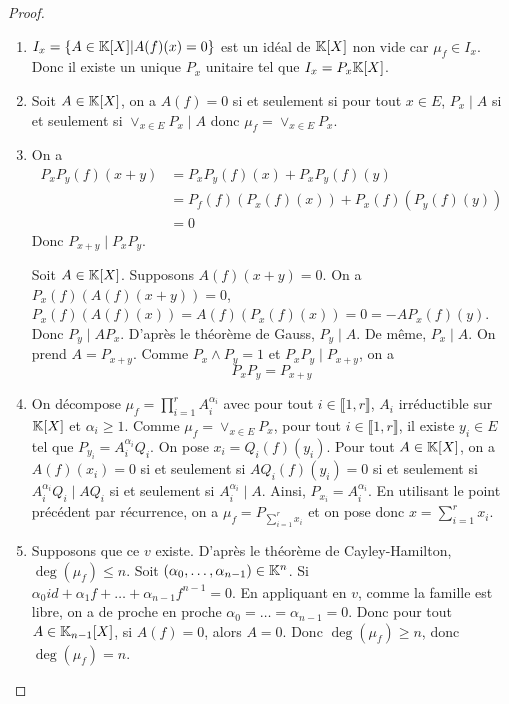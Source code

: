 \documentclass[12pt]{article}
\begin{document}
\begin{proof}
	\phantom{}
	\begin{enumerate}
		\item $I_{x}=\left\lbrace A\in\mathbb{K}[X]\middle| A(f)(x)=0\right\rbrace$ est un idéal de $\mathbb{K}[X]$ non vide car $\mu_{f}\in I_{x}$. Donc il existe un unique $P_{x}$ unitaire tel que $I_{x}=P_{x}\mathbb{K}[X]$.
		\item Soit $A\in\mathbb{K}[X]$, on a $A(f)=0$ si et seulement si pour tout $x\in E$, $P_{x}\mid A$ si et seulement si $\vee_{x\in E}P_{x}\mid A$ donc $\mu_{f}=\vee_{x\in E}P_{x}$.
		\item On a 
		\begin{align}
			P_{x}P_{y}(f)(x+y)
			&=P_{x}P_{y}(f)(x)+P_{x}P_{y}(f)(y)\\
			&=P_{f}(f)\left(P_{x}(f)(x)\right)+P_{x}(f)\left(P_{y}(f)(y)\right)\\
			&=0
		\end{align}
		Donc $P_{x+y}\mid P_{x}P_{y}$.

		Soit $A\in\mathbb{K}[X]$. Supposons $A(f)(x+y)=0$. On a $P_{x}(f)\left(A(f)(x+y)\right)=0$, $P_{x}(f)\left(A(f)(x)\right)=A(f)\left(P_{x}(f)(x)\right)=0=-AP_{x}(f)(y)$. Donc $P_{y}\mid AP_{x}$. D'après le théorème de Gauss, $P_{y}\mid A$. De même, $P_{x}\mid A$. On prend $A=P_{x+y}$. Comme $P_{x}\wedge P_{y}=1$ et $P_{x}P_{y}\mid P_{x+y}$, on a 
		\begin{equation}
			\boxed{P_{x}P_{y}=P_{x+y}}
		\end{equation}

		\item On décompose $\mu_{f}=\prod_{i=1}^{r}A_{i}^{\alpha_{i}}$ avec pour tout $i\in\llbracket1,r\rrbracket$, $A_{i}$ irréductible sur $\mathbb{K}[X]$ et $\alpha_{i}\geqslant1$.
		Comme $\mu_{f}=\vee_{x\in E}P_{x}$, pour tout $i\in\llbracket1,r\rrbracket$, il existe $y_{i}\in E$ tel que $P_{y_{i}}=A_{i}^{\alpha_{i}}Q_{i}$. On pose $x_{i}=Q_{i}(f)(y_{i})$. Pour tout $A\in\mathbb{K}[X]$, on a $A(f)(x_{i})=0$ si et seulement si $AQ_{i}(f)(y_{i})=0$ si et seulement si $A_{i}^{\alpha_{i}}Q_{i}\mid AQ_{i}$ si et seulement si $A_{i}^{\alpha_{i}}\mid A$. Ainsi, $P_{x_{i}}=A_{i}^{\alpha_{i}}$. En utilisant le point précédent par récurrence, on a $\mu_{f}=P_{\sum_{i=1}^{r}x_{i}}$ et on pose donc $x=\sum_{i=1}^{r}x_{i}$.

		\item Supposons que ce $v$ existe. D'après le théorème de Cayley-Hamilton, $\deg(\mu_{f})\leqslant n$. Soit $(\alpha_{0},\dots,\alpha_{n-1})\in\mathbb{K}^{n}$. Si $\alpha_{0}id+\alpha_{1}f+\dots+\alpha_{n-1}f^{n-1}=0$. En appliquant en $v$, comme la famille est libre, on a de proche en proche $\alpha_{0}=\dots=\alpha_{n-1}=0$. Donc pour tout $A\in\mathbb{K}_{n-1}[X]$, si $A(f)=0$, alors $A=0$. Donc $\deg(\mu_{f})\geqslant n$, donc $\deg(\mu_{f})=n$.
		

\end{enumerate}
\end{proof}
\end{document}
